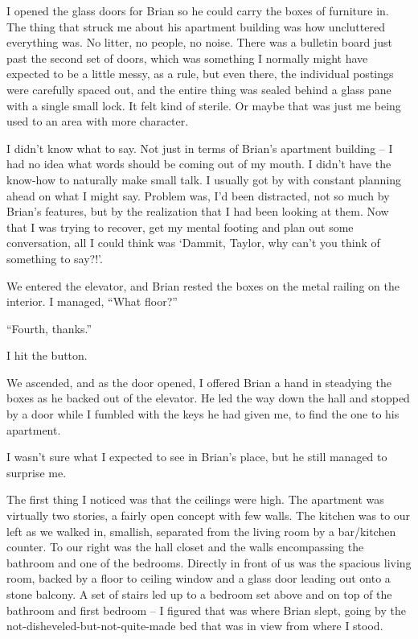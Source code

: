 





I opened the glass doors for Brian so he could carry the boxes of furniture in.  The thing that struck me about his apartment building was how uncluttered everything was.  No litter, no people, no noise.  There was a bulletin board just past the second set of doors, which was something I normally might have expected to be a little messy, as a rule, but even there, the individual postings were carefully spaced out, and the entire thing was sealed behind a glass pane with a single small lock.  It felt kind of sterile.  Or maybe that was just me being used to an area with more character.



I didn't know what to say.  Not just in terms of Brian's apartment building – I had no idea what words should be coming out of my mouth.  I didn't have the know-how to naturally make small talk.  I usually got by with constant planning ahead on what I might say.  Problem was, I'd been distracted, not so much by Brian's features, but by the realization that I had been looking at them.  Now that I was trying to recover, get my mental footing and plan out some conversation, all I could think was `Dammit, Taylor, why can't you think of something to say?!'.



We entered the elevator, and Brian rested the boxes on the metal railing on the interior. I managed, ``What floor?''



``Fourth, thanks.''



I hit the button.



We ascended, and as the door opened, I offered Brian a hand in steadying the boxes as he backed out of the elevator.  He led the way down the hall and stopped by a door while I fumbled with the keys he had given me, to find the one to his apartment.



I wasn't sure what I expected to see in Brian's place, but he still managed to surprise me.



The first thing I noticed was that the ceilings were high.  The apartment was virtually two stories, a fairly open concept with few walls.  The kitchen was to our left as we walked in, smallish, separated from the living room by a bar/kitchen counter.  To our right was the hall closet and the walls encompassing the bathroom and one of the bedrooms.  Directly in front of us was the spacious living room, backed by a floor to ceiling window and a glass door leading out onto a stone balcony.  A set of stairs led up to a bedroom set above and on top of the bathroom and first bedroom – I figured that was where Brian slept, going by the not-disheveled-but-not-quite-made bed that was in view from where I stood.



